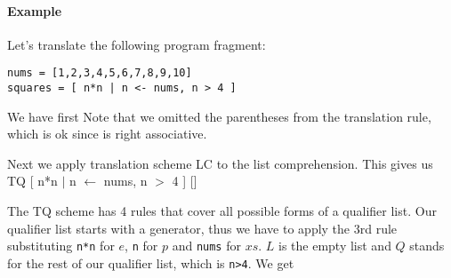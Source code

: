 
\paragraph{Example}
Let's translate the following program fragment:

\begin{verbatim}
nums = [1,2,3,4,5,6,7,8,9,10]
squares = [ n*n | n <- nums, n > 4 ]
\end{verbatim}

We have first 
Note that we omitted the parentheses from the translation rule, which is ok since \sym{:} is right associative.

Next we apply translation scheme LC to the list comprehension. This gives us\\
TQ [ n*n $|$ n $\leftarrow$ nums, n $>$ 4 ] []

The TQ scheme has 4 rules that cover all possible forms of a qualifier list. Our qualifier list starts with a generator, thus we have to apply the 3rd rule substituting \texttt{n*n} for $e$, \texttt{n} for $p$ and \texttt{nums} for $xs$. $L$ is the empty list and $Q$ stands for the rest of our qualifier list, which is \texttt{n>4}.
We get

